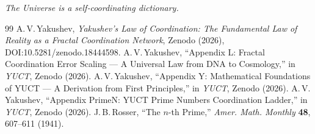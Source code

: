 \documentclass[12pt,a4paper]{article}
\begin{document}
	\begin{center}
		\textit{The Universe is a self‑coordinating dictionary.}
	\end{center}
	
	\begin{thebibliography}{99}
		A.\,V.\,Yakushev, \emph{Yakushev's Law of Coordination: The Fundamental Law of Reality as a Fractal Coordination Network}, Zenodo (2026), DOI:10.5281/zenodo.18444598.
		A.\,V.\,Yakushev, ``Appendix L: Fractal Coordination Error Scaling — A Universal Law from DNA to Cosmology,'' in \emph{YUCT}, Zenodo (2026).
		A.\,V.\,Yakushev, ``Appendix Y: Mathematical Foundations of YUCT — A Derivation from First Principles,'' in \emph{YUCT}, Zenodo (2026).
		A.\,V.\,Yakushev, ``Appendix PrimeN: YUCT Prime Numbers Coordination Ladder,'' in \emph{YUCT}, Zenodo (2026).
		J.\,B.\,Rosser, ``The \(n\)-th Prime,'' \emph{Amer. Math. Monthly} \textbf{48}, 607--611 (1941).
	\end{thebibliography}
	
\end{document}

